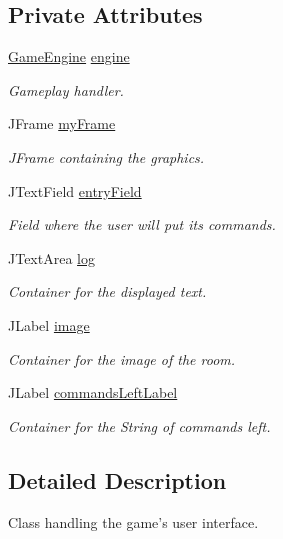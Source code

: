 \subsection*{Private Attributes}
\begin{DoxyCompactItemize}
\item 
\hyperlink{classGameEngine}{Game\-Engine} \hyperlink{classUserInterface_a661433c9712933f89b2cf30dfb10ffef}{engine}
\begin{DoxyCompactList}\small\item\em Gameplay handler. \end{DoxyCompactList}\item 
J\-Frame \hyperlink{classUserInterface_a1bb844238b260f6d4ae1852b6b1e0b97}{my\-Frame}
\begin{DoxyCompactList}\small\item\em J\-Frame containing the graphics. \end{DoxyCompactList}\item 
J\-Text\-Field \hyperlink{classUserInterface_a940367d996e9e7ad6e1fa1abfe35128b}{entry\-Field}
\begin{DoxyCompactList}\small\item\em Field where the user will put its commands. \end{DoxyCompactList}\item 
J\-Text\-Area \hyperlink{classUserInterface_a7f6ed10812f99e2cc6ce5f497d8ba2a0}{log}
\begin{DoxyCompactList}\small\item\em Container for the displayed text. \end{DoxyCompactList}\item 
J\-Label \hyperlink{classUserInterface_a0d115eb19b54f3e002ec6aa0fcfb1db4}{image}
\begin{DoxyCompactList}\small\item\em Container for the image of the room. \end{DoxyCompactList}\item 
J\-Label \hyperlink{classUserInterface_a88813d21f37fc65c1afae2250acd06d0}{commands\-Left\-Label}
\begin{DoxyCompactList}\small\item\em Container for the String of commands left. \end{DoxyCompactList}\end{DoxyCompactItemize}


\subsection{Detailed Description}
Class handling the game's user interface. 


